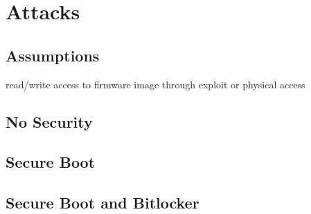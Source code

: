 
\chapter{Attacks}

\section{Assumptions}
read/write access to firmware image through exploit or physical access

\section{No Security}

\section{Secure Boot}

\section{Secure Boot and Bitlocker}



